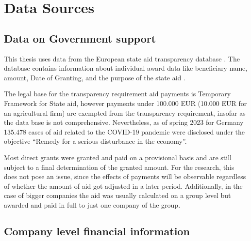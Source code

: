 
\chapter{Data Sources} %

\label{Chapter3} %


\section{Data on Government support}

This thesis uses data from the European state aid transparency database \parencite{eu_com_state_2023}. 
The database contains information about individual award data like beneficiary name, amount, Date of Granting, and the purpose of the state aid \parencite{eu_com_state_2023}. 

The legal base for the transparency requirement aid payments is Temporary Framework for State aid, however payments under 100.000 EUR (10.000 EUR for an agricultural firm) are exempted from the transparency requirement, insofar as the data base is not comprehensive. Nevertheless, as of spring 2023 for Germany 135.478 cases of aid related to the COVID-19 pandemic were disclosed under the objective “Remedy for a serious disturbance in the economy”. 

Most direct grants were granted and paid on a provisional basis and are still subject to a final determination of the granted amount. For the research, this does not pose an issue, since the effects of payments will be observable regardless of whether the amount of aid got adjusted in a later period. Additionally, in the case of bigger companies the aid was usually calculated on a group level but awarded and paid in full to just one company of the group. 





\section{Company level financial information}

